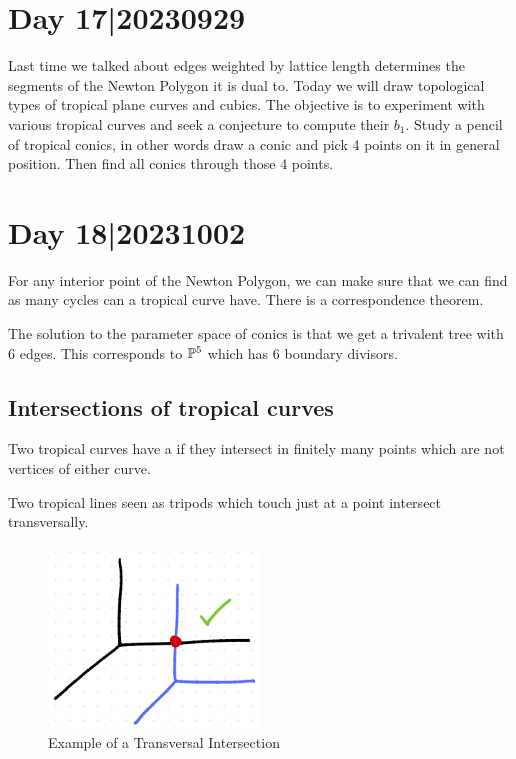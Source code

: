 \documentclass[12pt]{memoir}
\begin{document}
\section{Day 17|20230929}

Last time we talked about edges weighted by lattice length determines the segments of the Newton Polygon it is dual to. Today we will draw topological types of tropical plane curves and cubics. The objective is to experiment with various tropical curves and seek a conjecture to compute their $b_1$. Study a pencil of tropical conics, in other words draw a conic and pick 4 points on it in general position. Then find all conics through those 4 points.

\section{Day 18|20231002}%

For any interior point of the Newton Polygon, we can make sure that we can find as many cycles can a tropical curve have. There is a correspondence theorem.\par 
The solution to the parameter space of conics is that we get a trivalent tree with $6$ edges. This corresponds to $\mathbb{P}^5$ which has $6$ boundary divisors.

\subsection{Intersections of tropical curves}

\begin{Def}
    Two tropical curves have a  if they intersect in finitely many points which are not vertices of either curve.
\end{Def}

\begin{Ex}
    Two tropical lines seen as tripods which touch just at a point intersect transversally. 
    \begin{figure}[h!]
        \centering
        \includegraphics[width=0.5\textwidth]{figs/fig11-1-TransversalIntersectionExample.png}
        \caption{Example of a Transversal Intersection}
        \label{fig:11.1-TransversalIntersectionExample}
    \end{figure}
\end{Ex}
\end{document}
